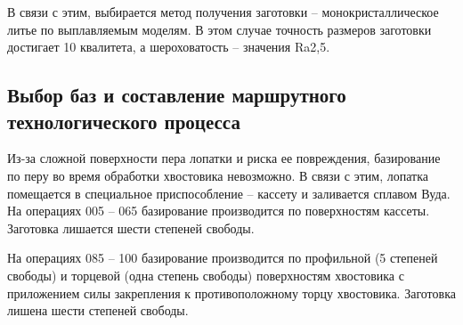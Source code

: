 В связи с этим, выбирается метод получения заготовки – монокристаллическое литье по выплавляемым моделям. В этом случае точность размеров заготовки достигает 10 квалитета, а шероховатость – значения Ra2,5.

\subsection{Выбор баз и составление маршрутного технологического процесса}

Из-за сложной поверхности пера лопатки и риска ее повреждения, базирование по перу во время обработки хвостовика невозможно. В связи с этим, лопатка помещается в специальное приспособление – кассету и заливается сплавом Вуда. На операциях 005 – 065 базирование производится по поверхностям кассеты. Заготовка лишается шести степеней свободы.

На операциях 085 – 100 базирование производится по профильной (5 степеней свободы) и торцевой (одна степень свободы) поверхностям хвостовика с приложением силы закрепления к противоположному торцу хвостовика. Заготовка лишена шести степеней свободы.